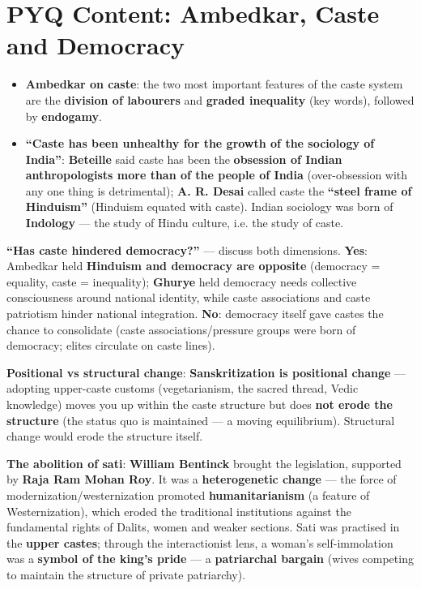 \section{PYQ Content: Ambedkar, Caste and Democracy}

\begin{KeyConcept}
\begin{itemize}
\item \textbf{Ambedkar on caste}: the two most important features of the caste system are the \textbf{division of labourers} and \textbf{graded inequality} (key words), followed by \textbf{endogamy}.
\item \textbf{``Caste has been unhealthy for the growth of the sociology of India''}: \textbf{Beteille} said caste has been the \textbf{obsession of Indian anthropologists more than of the people of India} (over-obsession with any one thing is detrimental); \textbf{A. R. Desai} called caste the \textbf{``steel frame of Hinduism''} (Hinduism equated with caste). Indian sociology was born of \textbf{Indology} --- the study of Hindu culture, i.e. the study of caste.
\end{itemize}
\end{KeyConcept}

\begin{KeyConcept}
\textbf{``Has caste hindered democracy?''} --- discuss both dimensions. \textbf{Yes}: Ambedkar held \textbf{Hinduism and democracy are opposite} (democracy = equality, caste = inequality); \textbf{Ghurye} held democracy needs collective consciousness around national identity, while caste associations and caste patriotism hinder national integration. \textbf{No}: democracy itself gave castes the chance to consolidate (caste associations/pressure groups were born of democracy; elites circulate on caste lines).
\end{KeyConcept}

\begin{KeyConcept}
\textbf{Positional vs structural change}: \textbf{Sanskritization is positional change} --- adopting upper-caste customs (vegetarianism, the sacred thread, Vedic knowledge) moves you up within the caste structure but does \textbf{not erode the structure} (the status quo is maintained --- a moving equilibrium). Structural change would erode the structure itself.
\end{KeyConcept}

\begin{ExampleBox}
\textbf{The abolition of sati}: \textbf{William Bentinck} brought the legislation, supported by \textbf{Raja Ram Mohan Roy}. It was a \textbf{heterogenetic change} --- the force of modernization/westernization promoted \textbf{humanitarianism} (a feature of Westernization), which eroded the traditional institutions against the fundamental rights of Dalits, women and weaker sections. Sati was practised in the \textbf{upper castes}; through the interactionist lens, a woman's self-immolation was a \textbf{symbol of the king's pride} --- a \textbf{patriarchal bargain} (wives competing to maintain the structure of private patriarchy).
\end{ExampleBox}

